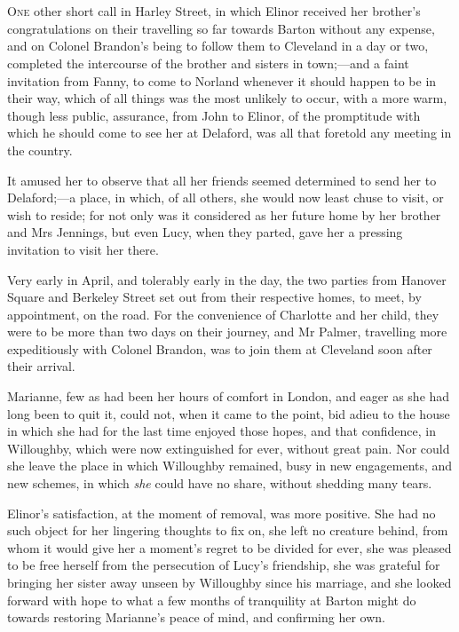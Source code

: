 \chapter[Chapter \thechapter]{}
\lettrine[lines=4,lraise=0.3]{O}{ne} other short call in Harley Street, in which Elinor received her brother’s congratulations on their travelling so far towards Barton without any expense, and on Colonel Brandon’s being to follow them to Cleveland in a day or two, completed the intercourse of the brother and sisters in town;—and a faint invitation from Fanny, to come to Norland whenever it should happen to be in their way, which of all things was the most unlikely to occur, with a more warm, though less public, assurance, from John to Elinor, of the promptitude with which he should come to see her at Delaford, was all that foretold any meeting in the country.

It amused her to observe that all her friends seemed determined to send her to Delaford;—a place, in which, of all others, she would now least chuse to visit, or wish to reside; for not only was it considered as her future home by her brother and Mrs Jennings, but even Lucy, when they parted, gave her a pressing invitation to visit her there.

Very early in April, and tolerably early in the day, the two parties from Hanover Square and Berkeley Street set out from their respective homes, to meet, by appointment, on the road. For the convenience of Charlotte and her child, they were to be more than two days on their journey, and Mr Palmer, travelling more expeditiously with Colonel Brandon, was to join them at Cleveland soon after their arrival.

Marianne, few as had been her hours of comfort in London, and eager as she had long been to quit it, could not, when it came to the point, bid adieu to the house in which she had for the last time enjoyed those hopes, and that confidence, in Willoughby, which were now extinguished for ever, without great pain. Nor could she leave the place in which Willoughby remained, busy in new engagements, and new schemes, in which \textit{she} could have no share, without shedding many tears.

Elinor’s satisfaction, at the moment of removal, was more positive. She had no such object for her lingering thoughts to fix on, she left no creature behind, from whom it would give her a moment’s regret to be divided for ever, she was pleased to be free herself from the persecution of Lucy’s friendship, she was grateful for bringing her sister away unseen by Willoughby since his marriage, and she looked forward with hope to what a few months of tranquility at Barton might do towards restoring Marianne’s peace of mind, and confirming her own.

